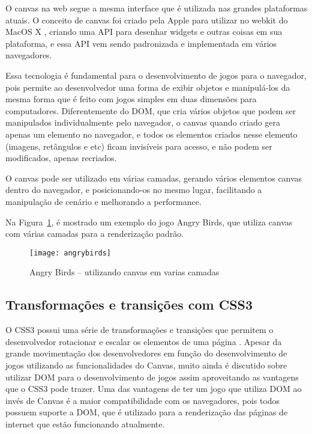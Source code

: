 O canvas na web segue a mesma interface que é utilizada nas grandes
plataformas atuais. O conceito de canvas foi criado pela Apple para
utilizar no webkit do MacOS X \cite{lubbers2010pro}, criando uma API
para desenhar widgets e outras coisas em sua plataforma, e essa API
vem sendo padronizada e implementada em vários navegadores.

Essa tecnologia é fundamental para o desenvolvimento de jogos para
o navegador, pois permite ao desenvolvedor uma forma de exibir
objetos e manipulá-los da mesma forma que é feito com jogos
simples em duas dimensões para computadores.
Diferentemente do DOM, que cria vários objetos que podem ser
manipulados individualmente pelo navegador, o canvas quando criado
gera apenas um elemento no navegador, e todos os elementos criados
nesse elemento (imagens, retângulos e etc) ficam invisíveis para acesso, e
não podem ser modificados, apenas recriados.

O canvas pode ser utilizado em várias camadas, gerando vários
elementos canvas dentro do navegador, e posicionando-os no mesmo
lugar, facilitando a manipulação de cenário e melhorando a
performance.

Na Figura~\ref{img:angrybirds}, é mostrado um exemplo do jogo Angry
Birds, que utiliza canvas com várias camadas para a renderização padrão.

\newlength{\imgwidth}
\setlength{\imgwidth}{16.09cm}
\newlength{\imgheight}
\setlength{\imgheight}{10.59cm}

\begin{figure}[H]
  \centering
	\texttt{[image: angrybirds]}
  \caption{Angry Birds {--} utilizando canvas em varias camadas}
  \label{img:angrybirds}
\end{figure}


\subsection{Transformações e transições com CSS3}

O CSS3 possui uma série de transformações e transições que permitem o
desenvolvedor rotacionar e escalar os elementos de uma página
\cite{agi2011html5}. Apesar da grande movimentação dos desenvolvedores
em função do desenvolvimento de jogos utilizando as funcionalidades do
Canvas, muito ainda é discutido sobre utilizar DOM para o
desenvolvimento de jogos assim aproveitando as vantagens que o CSS3
pode trazer.
Uma das vantagens de ter um jogo que utiliza DOM ao invés de Canvas é
a maior compatibilidade com os navegadores, pois todos possuem suporte
a DOM, que é utilizado para a renderização das páginas de internet que
estão funcionando atualmente.

